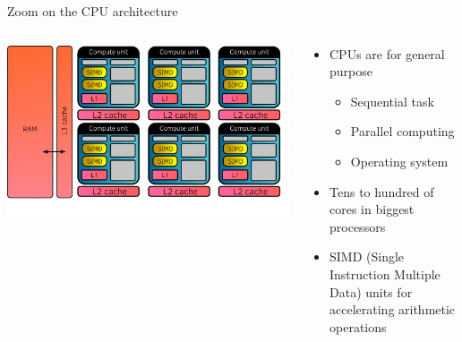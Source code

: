 \documentclass[aspectratio=169]{beamer}
\begin{document}
\begin{frame}{Zoom on the CPU architecture}
    \begin{columns}
        \begin{column}{0.5\linewidth}
            \begin{center}
                \includegraphics[width=\linewidth]{cpu_architecture.png}
            \end{center}
        \end{column}
        \begin{column}{0.5\linewidth}
            \begin{itemize}
                \item CPUs are for general purpose
                \begin{itemize}
                    \item Sequential task
                    \item Parallel computing
                    \item Operating system
                \end{itemize}
                \item Tens to hundred of cores in biggest processors
                \item SIMD (Single Instruction Multiple Data) units for accelerating arithmetic operations
            \end{itemize}
        \end{column}
    \end{columns}
\end{frame}

\end{document}
